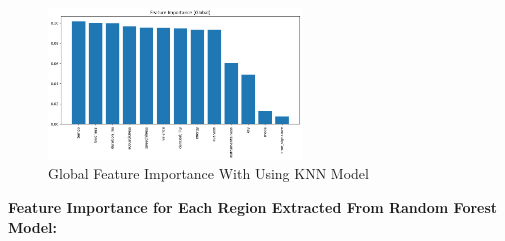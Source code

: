 \begin{figure}[h] 
    \centering 
    \includegraphics[width=0.6\textwidth]{media/random_forest_feature_imp_global.png} %
    \caption{Global Feature Importance With Using KNN Model}

\end{figure}





\textbf{Feature Importance for Each Region Extracted From Random Forest Model:}




